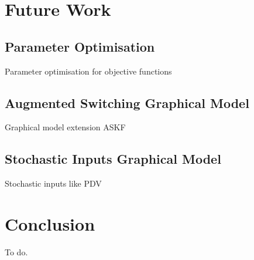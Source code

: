 \chapter{Future Work}

\section{Parameter Optimisation}
Parameter optimisation for objective functions

\section{Augmented Switching Graphical Model}
Graphical model extension ASKF

\section{Stochastic Inputs Graphical Model}
Stochastic inputs like PDV

\chapter{Conclusion}
To do.
